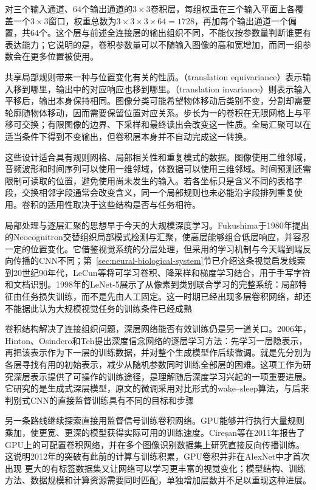 对三个输入通道、$64$个输出通道的$3\times3$卷积层，每组权重在三个输入平面上各覆盖一个$3\times3$窗口，权重总数为$3\times3\times3\times64=1728$，再加每个输出通道一个偏置，共$64$个。这个层与前述全连接层的输出组织不同，不能仅按参数量判断谁更有表达能力；它说明的是，卷积参数量可以不随输入图像的高和宽增加，而同一组参数会在更多位置被使用。

共享局部规则带来一种与位置变化有关的性质。（translation equivariance）表示输入移到哪里，输出中的对应响应也移到哪里。（translation invariance）则表示输入平移后，输出本身保持相同。图像分类可能希望物体移动后类别不变，分割却需要轮廓随物体移动，因而需要保留位置对应关系。步长为一的卷积在无限网格上与平移可交换；有限图像的边界、下采样和最终读出会改变这一性质。全局汇聚可以在适当条件下得到不变输出，但卷积层本身并不自动完成这一转换。

这些设计适合具有规则网格、局部相关性和重复模式的数据。图像使用二维邻域，音频波形和时间序列可以使用一维邻域，体数据可以使用三维邻域。时间预测还需限制可读取的位置，避免使用尚未发生的输入。若各坐标只是含义不同的表格字段，交换相邻字段通常会改变含义，同一个局部规则也未必能沿字段排列重复使用。卷积的适用性取决于这些结构是否与任务相符。

局部处理与逐层汇聚的思想早于今天的大规模深度学习。Fukushima于1980年提出的Neocognitron交替组织局部模式检测与汇聚，使高层能够组合低层响应，并容忍一定的位置变化。它借鉴视觉系统的分层处理，但采用的学习机制与今天端到端反向传播的CNN不同；第~\ref{sec:neural-biological-system}节已介绍这条视觉启发线索
到20世纪90年代，LeCun等将可学习卷积、降采样和梯度学习结合，用于手写字符和文档识别。1998年的LeNet-5展示了从像素到类别联合学习的完整系统：局部特征由任务损失训练，而不是先由人工固定。这一时期已经出现多层卷积网络，却还不能据此认为大规模视觉任务的训练条件已经成熟

卷积结构解决了连接组织问题，深层网络能否有效训练仍是另一道关口。2006年，Hinton、Osindero和Teh提出深度信念网络的逐层学习方法：先学习一层隐表示，再把该表示作为下一层的训练数据，并对整个生成模型作后续微调。就是先分别为各层寻找有用的初始表示，减少从随机参数同时训练全部层的困难。这项工作为研究深层表示提供了可操作的训练途径，是理解随后深度学习兴起的一项重要进展。它研究的是生成式深层模型，原文的微调采用对比形式的wake--sleep算法，与后来判别式CNN的直接监督训练具有不同的目标和步骤

另一条路线继续探索直接用监督信号训练卷积网络。GPU能够并行执行大量规则乘加，使更宽、更深的模型获得实际可用的训练速度。Cireșan等在2011年报告了GPU上的可配置卷积网络，并在多个图像识别数据集上研究直接反向传播训练。这说明2012年的突破有此前的计算与训练积累，GPU卷积并非在AlexNet中才首次出现
更大的有标签数据集又让网络可以学习更丰富的视觉变化；模型结构、训练方法、数据规模和计算资源需要同时匹配，单独增加层数并不足以重现这种进展。

